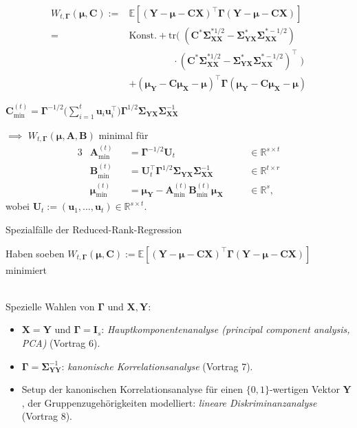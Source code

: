 \documentclass[12pt, aspectratio=169]{beamer}
\newcommand{\E}{\mathbb{E}}
\newcommand{\R}{\mathbb{R}}
\newcommand{\X}{\mathbf{X}}
\newcommand{\Y}{\mathbf{Y}}
\newcommand{\muu}{\bm{\mu}}
\newcommand{\Ssigma}{\bm{\Sigma}}
\newcommand{\uu}{\mathbf{u}}
\newcommand{\C}{\mathbf{C}}
\newcommand{\A}{\mathbf{A}}
\newcommand{\B}{\mathbf{B}}
\newcommand{\Ggamma}{\bm{\Gamma}}
\newcommand{\tr}{\mathrm{tr}}
\begin{document}
\begin{frame}
	\begin{alertblock}{}
		\setlength\abovedisplayskip{0pt}
		\begin{align*}
		W_{t, \Ggamma}(\muu, \C) :={}& \E[(\Y - \muu - \C \X)^{\top} \Ggamma (\Y - \muu - \C \X)] \\
		={}& \text{Konst.} 
		+ \tr( \; (\C^\ast \Ssigma_{\X\X}^{\ast 1/2} - \Ssigma_{\Y\X}^\ast \Ssigma_{\X\X}^{\ast -1/2}) \\
		&  \;\; \quad \quad \qquad \cdot (\C^\ast \Ssigma_{\X\X}^{\ast 1/2} - \Ssigma_{\Y\X}^\ast \Ssigma_{\X\X}^{\ast -1/2})^\top \;) \\
		&+ (\muu_\Y - \C \muu_\X - \muu)^\top \Ggamma (\muu_\Y - \C \muu_\X - \muu)
		\end{align*}
	\end{alertblock}
\begin{alertblock}{}
	\begin{center}
		$\C^{(t)}_{\min} = \Ggamma^{-1/2} \biggl( \sum_{i=1}^{t} \uu_i \uu_i^\top \biggr) \Ggamma^{1/2} \Ssigma_{\Y\X} \Ssigma_{\X\X}^{-1}$
	\end{center}
\end{alertblock}
	$\implies$ $W_{t, \Ggamma}(\muu, \A, \B)$ minimal für
	\begin{alignat*}{3}
	&\A^{(t)}_{\min}   &&= \Ggamma^{-1/2} \mathbf{U}_t                                       &&\quad \in \R^{s \times t} \\
	&\B^{(t)}_{\min}   &&= \mathbf{U}_t^\top \Ggamma^{1/2} \Ssigma_{\Y\X}\Ssigma_{\X\X}^{-1} &&\quad \in \R^{t \times r} \\
	&\muu^{(t)}_{\min} &&= \muu_\Y - \A^{(t)}_{\min} \B^{(t)}_{\min} \muu_\X                 &&\quad \in \R^s \text{,}
	\end{alignat*}
	wobei $\mathbf{U}_t := (\uu_1,\dots, \uu_t) \in \R^{s \times t}$. \hfill \qedsymbol
\end{frame}

\begin{frame}{Spezialfälle der Reduced-Rank-Regression}
	\begin{alertblock}{}
		\begin{center}
			Haben soeben $ W_{t, \Ggamma}(\muu, \C) := \E[(\Y - \muu - \C \X)^{\top} \Ggamma (\Y - \muu - \C \X)]$ minimiert
		\end{center}
	\end{alertblock}
$\;$ \\
	Spezielle Wahlen von $\Ggamma$ und $\X, \Y$:
	\begin{itemize}
		\item $\X = \Y$ und $\Ggamma = \mathbf{I}_s$: \textit{Hauptkomponentenanalyse (principal component analysis, PCA)} (Vortrag 6).
		\item $\Ggamma = \Ssigma_{\Y\Y}^{-1}$: \textit{kanonische Korrelationsanalyse} (Vortrag 7).
		\item Setup der kanonischen Korrelationsanalyse für einen $\{0, 1\}$-wertigen Vektor $\Y$, der Gruppenzugehörigkeiten modelliert: \textit{lineare Diskriminanzanalyse} (Vortrag 8).
	\end{itemize}
\end{frame}
\end{document}
